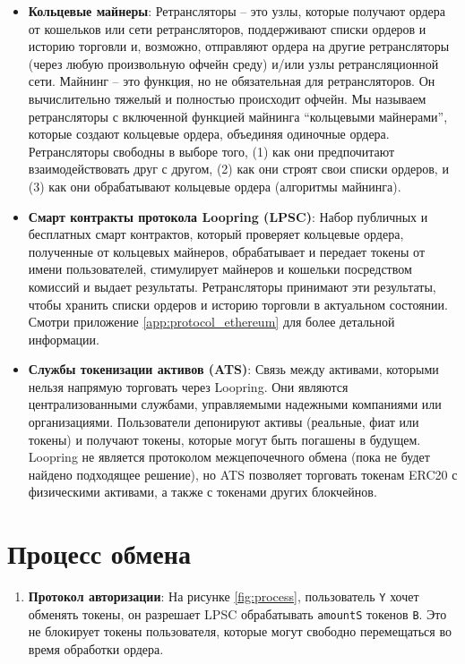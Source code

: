 \documentclass[utf8,nofonts]{article}
\begin{document}
\begin{multicols}{2}
\begin{itemize}
		\item \textbf{Кольцевые майнеры}: Ретрансляторы -- это узлы, которые получают ордера от кошельков или сети ретрансляторов, поддерживают списки ордеров и историю торговли и, возможно, отправляют ордера на другие ретрансляторы (через любую произвольную офчейн среду) и/или узлы ретрансляционной сети. Майнинг -- это функция, но не обязательная для ретрансляторов. Он вычислительно тяжелый и полностью происходит офчейн. Мы называем ретрансляторы с включенной функцией майнинга \enquote{кольцевыми майнерами}, которые создают кольцевые ордера, объединяя одиночные ордера. Ретрансляторы свободны в выборе того, (1) как они предпочитают взаимодействовать друг с другом, (2) как они строят свои списки ордеров, и (3) как они обрабатывают кольцевые ордера (алгоритмы майнинга).
		
		\item \textbf{Смарт контракты протокола Loopring (LPSC)}: Набор публичных и бесплатных смарт контрактов, который проверяет кольцевые ордера, полученные от кольцевых майнеров, обрабатывает и передает токены от имени пользователей, стимулирует майнеров и кошельки посредством комиссий и выдает результаты. Ретрансляторы принимают эти результаты, чтобы хранить списки ордеров и историю торговли в актуальном состоянии. Смотри приложение \ref{app:protocol_ethereum} для более детальной информации.
		
		\item \textbf{Службы токенизации активов (ATS)}: Связь между активами, которыми нельзя напрямую торговать через Loopring. Они являются централизованными службами, управляемыми надежными компаниями или организациями. Пользователи депонируют активы (реальные, фиат или токены) и получают токены, которые могут быть погашены в будущем. Loopring не является протоколом межцепочечного обмена (пока не будет найдено подходящее решение), но ATS позволяет торговать токенам ERC20 \cite{ERC20} с физическими активами, а также с токенами других блокчейнов. 
		
	\end{itemize}
	
	
	\section{Процесс обмена\label{sec:process}}
	
	
	
	\begin{enumerate} 
		
		
		\item \textbf{Протокол авторизации}: На рисунке \ref{fig:process}, пользователь \verb|Y| хочет обменять токены, он разрешает LPSC обрабатывать \verb|amountS| токенов \verb|B|. Это не блокирует токены пользователя, которые могут свободно перемещаться во время обработки ордера.
		

\end{enumerate}
\end{multicols}
\end{document}
